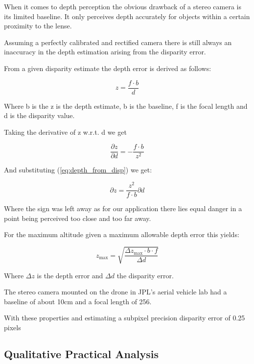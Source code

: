 When it comes to depth perception the obvious drawback of a stereo camera is its limited baseline. It only perceives depth accurately for objects within a certain proximity to the lense. 

Assuming a perfectly calibrated and rectified camera there is still always an inaccuracy in the depth estimation arising from the disparity error.

From a given disparity estimate the depth error is derived as follows:

\begin{equation}\label{eq:depth_from_disp}
    z = \frac{f \cdot b}{d}
\end{equation}

Where b is the z is the depth estimate, b is the baseline, f is the focal length and d is the disparity value.

Taking the derivative of z w.r.t. d we get

\begin{equation}
    \frac{\partial z}{\partial d} = - \frac{f  \cdot b}{z^2}
\end{equation}

And substituting (\cref{eq:depth_from_disp}) we get:

\begin{equation}
    {\partial z} = \frac{z^2}{f  \cdot b}\partial d
\end{equation}

Where the sign was left away as for our application there lies equal danger in a point being perceived too close and too far away.

For the maximum altitude given a maximum allowable depth error this yields:

\begin{equation}
    z_{\text{max}} = \sqrt{\frac{\Delta z_{\text{max}} \cdot b \cdot f}{\Delta d}}
\end{equation}

Where $\Delta z$ is the depth error and $\Delta d$ the disparity error.

The stereo camera mounted on the drone in JPL's aerial vehicle lab had a baseline of about 10cm and a focal length of 256.

With these properties and estimating a subpixel precision disparity error of 0.25 pixels 




\subsection{Qualitative Practical Analysis}



